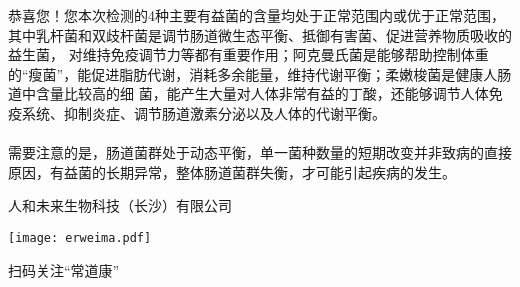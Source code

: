 \vspace*{-2.5mm}

\vspace*{3mm}
\begin{spacing}{1.5}

\vspace*{2mm}
{\indent\fontsize{9pt}{10pt}\selectfont 
恭喜您！您本次检测的4种主要有益菌的含量均处于正常范围内或优于正常范围，其中乳杆菌和双歧杆菌是调节肠道微生态平衡、抵御有害菌、促进营养物质吸收的益生菌，
对维持免疫调节力等都有重要作用；阿克曼氏菌是能够帮助控制体重的“瘦菌”，能促进脂肪代谢，消耗多余能量，维持代谢平衡；柔嫩梭菌是健康人肠道中含量比较高的细
菌，能产生大量对人体非常有益的丁酸，还能够调节人体免疫系统、抑制炎症、调节肠道激素分泌以及人体的代谢平衡。
\\\\
\indent 需要注意的是，肠道菌群处于动态平衡，单一菌种数量的短期改变并非致病的直接原因，有益菌的长期异常，整体肠道菌群失衡，才可能引起疾病的发生。}
\end{spacing}

\vspace*{5mm}

\noindent\colorbox{topcolor}{
\parbox{0.6\hsize}{
\color{white}\fontsize{9pt}{\baselineskip}\selectfont { 以上为您本次检测结果，如有任何疑问，请咨询专业医生！}
}
}

\vspace*{.5mm}

\noindent\colorbox{topcolor}{
\parbox{0.6\hsize}{
\color{white}\fontsize{9pt}{\baselineskip}\selectfont { 再次感谢您的信任和支持！}
}
}

\vspace*{3mm}

\hfill\fontsize{9pt}{11pt}\selectfont 人和未来生物科技（长沙）有限公司

\vspace*{-2mm}

\hfill\texttt{[image: erweima.pdf]}


\hfill\fontsize{9pt}{11pt}\selectfont 扫码关注“常道康”


